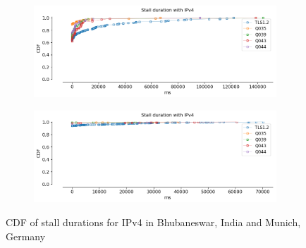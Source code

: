 \begin{frame}
\begin{figure}[!htb]
    \begin{subfigure}{0.45\textwidth}
        \includegraphics[width=\linewidth]{./plots/youtube/india/graph_stall_durations.png}
    \end{subfigure}
    \begin{subfigure}{0.45\textwidth}
        \includegraphics[width=\linewidth]{./plots/youtube/munich/graph_stall_durations.png}
    \end{subfigure}    
    \caption{CDF of stall durations for IPv4 in Bhubaneswar, India and Munich, Germany}\label{fig:cdf-of-stall}
\end{figure}
\end{frame}
\clearpage

